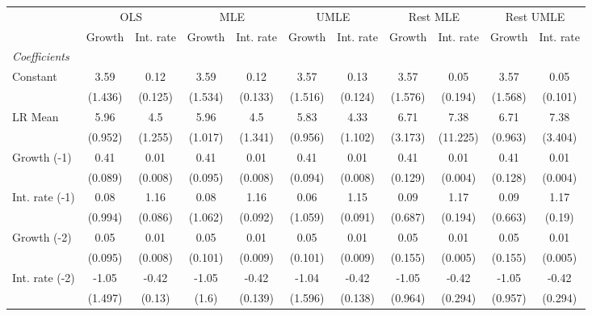 \begin{table}[htbp] 
	\centering
	\begin{tabular}{@{\extracolsep{4pt}}lcccccccccc@{}}		\hline\hline
		 		 & \multicolumn{2}{c}{OLS} &\multicolumn{2}{c}{MLE} &\multicolumn{2}{c}{UMLE} &\multicolumn{2}{c}{Rest MLE} &\multicolumn{2}{c}{Rest UMLE} \\ 
 		 & Growth 	 & Int. rate 	 & Growth 	 & Int. rate 	 & Growth 	 & Int. rate 	 & Growth 	 & Int. rate 	 & Growth 	 & Int. rate\\\cline{2-3}\cline{4-5}\cline{6-7}\cline{8-9}\cline{10-11}
\rule{0pt}{4ex} 
 \emph{Coefficients} 	  		 & 		 & 		 & 		 & 		 & 		 & 		 & 		 & 		 & 		 &\\ 
\quad Constant 	 & 3.59 	 & 0.12 	 & 3.59 	 & 0.12 	 & 3.57 	 & 0.13 	 & 3.57 	 & 0.05 	 & 3.57 	 & 0.05	 \\ 
 		 & (1.436) 	 & (0.125) 	 & (1.534) 	 & (0.133) 	 & (1.516) 	 & (0.124) 	 & (1.576) 	 & (0.194) 	 & (1.568) 	 & (0.101) 	 \\ 
\quad LR Mean 	 & 5.96 	 & 4.5 	 & 5.96 	 & 4.5 	 & 5.83 	 & 4.33 	 & 6.71 	 & 7.38 	 & 6.71 	 & 7.38	 \\ 
 		 & (0.952) 	 & (1.255) 	 & (1.017) 	 & (1.341) 	 & (0.956) 	 & (1.102) 	 & (3.173) 	 & (11.225) 	 & (0.963) 	 & (3.404) 	 \\ 
\quad Growth (-1) 	 &0.41 	 & 0.01 	 & 0.41 	 & 0.01 	 & 0.41 	 & 0.01 	 & 0.41 	 & 0.01 	 & 0.41 	 & 0.01	 \\ 
 		 & (0.089) 	 & (0.008) 	 & (0.095) 	 & (0.008) 	 & (0.094) 	 & (0.008) 	 & (0.129) 	 & (0.004) 	 & (0.128) 	 & (0.004) 	 \\ 
\quad Int. rate (-1) 	 &0.08 	 & 1.16 	 & 0.08 	 & 1.16 	 & 0.06 	 & 1.15 	 & 0.09 	 & 1.17 	 & 0.09 	 & 1.17	 \\ 
 		 & (0.994) 	 & (0.086) 	 & (1.062) 	 & (0.092) 	 & (1.059) 	 & (0.091) 	 & (0.687) 	 & (0.194) 	 & (0.663) 	 & (0.19) 	 \\ 
\quad Growth (-2) 	 &0.05 	 & 0.01 	 & 0.05 	 & 0.01 	 & 0.05 	 & 0.01 	 & 0.05 	 & 0.01 	 & 0.05 	 & 0.01	 \\ 
 		 & (0.095) 	 & (0.008) 	 & (0.101) 	 & (0.009) 	 & (0.101) 	 & (0.009) 	 & (0.155) 	 & (0.005) 	 & (0.155) 	 & (0.005) 	 \\ 
\quad Int. rate (-2) 	 &-1.05 	 & -0.42 	 & -1.05 	 & -0.42 	 & -1.04 	 & -0.42 	 & -1.05 	 & -0.42 	 & -1.05 	 & -0.42	 \\ 
 		 & (1.497) 	 & (0.13) 	 & (1.6) 	 & (0.139) 	 & (1.596) 	 & (0.138) 	 & (0.964) 	 & (0.294) 	 & (0.957) 	 & (0.294) 	 \\ 

\end{tabular}
\end{table}

